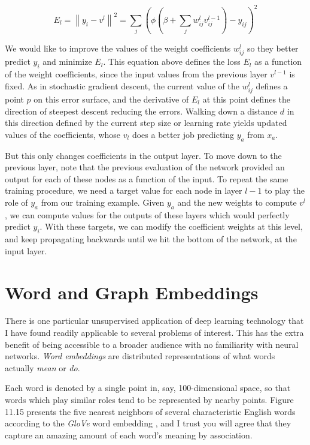 \documentclass[10pt]{article}
\begin{document}
\begin{enumerate}
\[
E_{l}=\left\|y_{i}-v^{l}\right\|^{2}=\sum_{j}\left(\phi\left(\beta+\sum_{j} w_{ij}^{l} v_{ij}^{l-1}\right)-y_{ij}\right)^{2}
\]

We would like to improve the values of the weight coefficients $w_{ij}^{l}$ so they better predict $y_{i}$ and minimize $E_{l}$. This equation above defines the loss $E_{l}$ as a function of the weight coefficients, since the input values from the previous layer $v^{l-1}$ is fixed. As in stochastic gradient descent, the current value of the $w_{ij}^{l}$ defines a point $p$ on this error surface, and the derivative of $E_{l}$ at this point defines the direction of steepest descent reducing the errors. Walking down a distance $d$ in this direction defined by the current step size or learning rate yields updated values of the coefficients, whose $v_{l}$ does a better job predicting $y_{a}$ from $x_{a}$.

But this only changes coefficients in the output layer. To move down to the previous layer, note that the previous evaluation of the network provided an output for each of these nodes as a function of the input. To repeat the same training procedure, we need a target value for each node in layer $l-1$ to play the role of $y_{a}$ from our training example. Given $y_{a}$ and the new weights to compute $v^{l}$, we can compute values for the outputs of these layers which would perfectly predict $y_{i}$. With these targets, we can modify the coefficient weights at this level, and keep propagating backwards until we hit the bottom of the network, at the input layer.

\section{Word and Graph Embeddings}
There is one particular unsupervised application of deep learning technology that I have found readily applicable to several problems of interest. This has the extra benefit of being accessible to a broader audience with no familiarity with neural networks. \textit{Word embeddings} are distributed representations of what words actually \textit{mean} or \textit{do}.

Each word is denoted by a single point in, say, 100-dimensional space, so that words which play similar roles tend to be represented by nearby points. Figure 11.15 presents the five nearest neighbors of several characteristic English words according to the \textit{GloVe} word embedding \cite{pennington2014glove}, and I trust you will agree that they capture an amazing amount of each word's meaning by association.


\end{enumerate}
\end{document}
